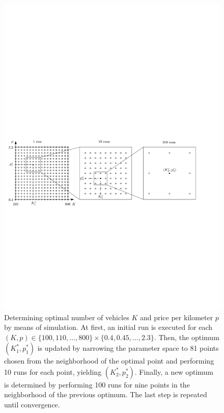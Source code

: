 \documentclass[dissertation,draft*]{aaltoseries}
\begin{document}
\begin{figure} [ht]
\begin{center}
\includegraphics[width=\textwidth]{simulation02}
\caption{Determining optimal number of vehicles $K$ and price per kilometer $p$ by means of 
simulation. At first, an initial run is executed for each $(K,p) \in \{100, 110, \ldots, 800\} \times \{0.4, 0.45, \ldots, 2.3\}$.
Then, the optimum $(K^*_1,p^*_1)$ is updated by narrowing the parameter space to 81 points chosen from the neighborhood of the optimal point and 
performing 10 runs for each point, yielding $(K^*_2,p^*_2)$.
Finally, a new optimum is determined by performing 100 runs for nine points in the neighborhood of the previous optimum. 
The last step is repeated until convergence.} 
\label{simulationkuva}
\end{center}
\end{figure}
\end{document}
